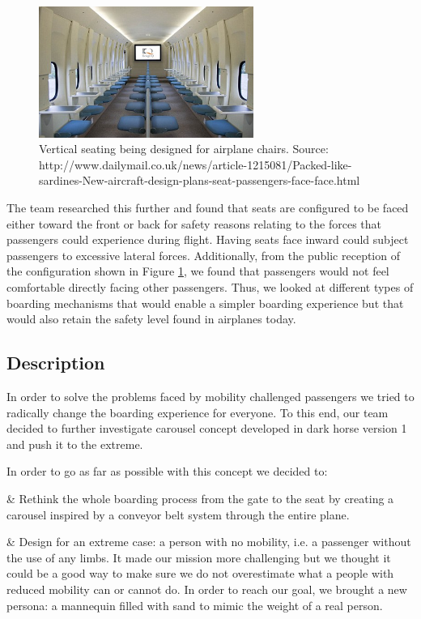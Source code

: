 \begin{figure}[h]
  \centering
     \includegraphics[width=7cm]{images/cabin_against_wall.jpg}
   \caption{Vertical seating being designed for airplane chairs. Source: http://www.dailymail.co.uk/news/article-1215081/Packed-like-sardines-New-aircraft-design-plans-seat-passengers-face-face.html}
  \label{fig:cabin_against_wall.jpg}
\end{figure} 

The team researched this further and found that seats are configured to be faced either toward the front or back for safety reasons relating to the forces that passengers could experience during flight. Having seats face inward could subject passengers to excessive lateral forces. Additionally, from the public reception of the configuration shown in Figure \ref{fig:cabin_against_wall.jpg},  we found that passengers would not feel comfortable directly facing other passengers. Thus, we looked at different types of boarding mechanisms that would enable a simpler boarding experience but that would also retain the safety level found in airplanes today. 

\subsection{Description}
In order to solve the problems faced by mobility challenged passengers we tried to radically change the boarding experience for everyone. To this end, our team decided to further investigate carousel concept developed in dark horse version 1 and push it to the extreme.

In order to go as far as possible with this concept we decided to:

 \begin{easylist}[itemize]

& Rethink the whole boarding process from the gate to the seat by creating a carousel inspired by a conveyor belt system through the entire plane.

& Design for an extreme case: a person with no mobility, i.e. a passenger without the use of any limbs. It made our mission more challenging but we thought it could be a good way to make sure we do not overestimate what a people with reduced mobility can or cannot do. In order to reach our goal, we brought a new persona: a mannequin filled with sand to mimic the weight of a real person.

\end{easylist}

